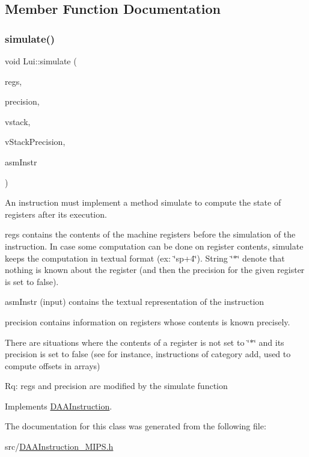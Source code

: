\subsection{Member Function Documentation}
\mbox{\label{classLui_acdaa22ad7bf3485619585ea8c6adbda4}} 
\subsubsection{\texorpdfstring{simulate()}{simulate()}}
{\footnotesize\ttfamily void Lui\+::simulate (\begin{DoxyParamCaption}\item[{vector$<$ string $>$ \&}]{regs,  }\item[{vector$<$ bool $>$ \&}]{precision,  }\item[{\hyperlink{DAAInstruction_8h_a1b0e70ac1a04f06c8132055ed01f589f}{stack\+Type} \&}]{vstack,  }\item[{\hyperlink{DAAInstruction_8h_ac5cb793e9dac3fa9693da78b7e29ab30}{stack\+Prec\+Type} \&}]{v\+Stack\+Precision,  }\item[{const string \&}]{asm\+Instr }\end{DoxyParamCaption})\hspace{0.3cm}{\ttfamily [virtual]}}

An instruction must implement a method simulate to compute the state of registers after its execution.

regs contains the contents of the machine registers before the simulation of the instruction. In case some computation can be done on register contents, simulate keeps the computation in textual format (ex\+: \char`\"{}sp+4\char`\"{}). String \char`\"{}$\ast$\char`\"{} denote that nothing is known about the register (and then the precision for the given register is set to false).

asm\+Instr (input) contains the textual representation of the instruction

precision contains information on registers whose contents is known precisely.

There are situations where the contents of a register is not set to \char`\"{}$\ast$\char`\"{} and its precision is set to false (see for instance, instructions of category add, used to compute offsets in arrays)

Rq\+: regs and precision are modified by the simulate function 

Implements \hyperlink{classDAAInstruction_a61d0b9bece1e0ead89a46c0197276324}{D\+A\+A\+Instruction}.



The documentation for this class was generated from the following file\+:\begin{DoxyCompactItemize}
\item 
src/\hyperlink{DAAInstruction__MIPS_8h}{D\+A\+A\+Instruction\+\_\+\+M\+I\+P\+S.\+h}\end{DoxyCompactItemize}
